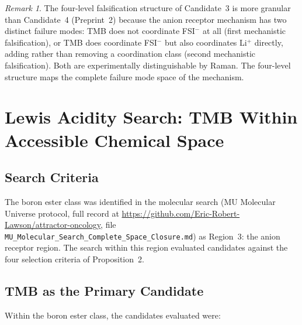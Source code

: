 \documentclass[11pt]{article}
\theoremstyle{plain}
\theoremstyle{definition}
\theoremstyle{remark}
\newtheorem{remark}{Remark}[section]
\begin{document}
\begin{remark}
The four-level falsification structure of Candidate~3 is more granular
than Candidate~4 (Preprint~2) because the anion receptor mechanism
has two distinct failure modes: TMB does not coordinate FSI$^-$ at all
(first mechanistic falsification), or TMB does coordinate FSI$^-$ but
also coordinates Li$^+$ directly, adding rather than removing a
coordination class (second mechanistic falsification).  Both are
experimentally distinguishable by Raman.  The four-level structure
maps the complete failure mode space of the mechanism.
\end{remark}

\section{Lewis Acidity Search: TMB Within Accessible Chemical Space}
\label{sec:Lewis_search}

\subsection{Search Criteria}

The boron ester class was identified in the molecular search
(MU Molecular Universe protocol, full record at
\url{https://github.com/Eric-Robert-Lawson/attractor-oncology},
file \texttt{MU\_Molecular\_Search\_Complete\_Space\_Closure.md}) as
Region~3: the anion receptor region.  The search within this region
evaluated candidates against the four selection criteria of
Proposition~2.

\subsection{TMB as the Primary Candidate}

Within the boron ester class, the candidates evaluated were:
\end{document}
